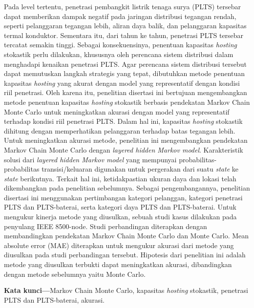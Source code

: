 {
Pada level tertentu, penetrasi pembangkit listrik tenaga surya (PLTS) tersebar dapat memberikan dampak negatif pada jaringan distribusi tegangan rendah, seperti pelanggaran tegangan lebih, aliran daya balik, dan pelanggaran kapasitas termal konduktor. Sementara itu, dari tahun ke tahun, penetrasi PLTS tersebar tercatat semakin tinggi. Sebagai konsekuensinya, penentuan kapasitas \textit{hosting} stokastik perlu dilakukan, khususnya oleh perencana sistem distribusi dalam menghadapi kenaikan penetrasi PLTS. Agar perencana sistem distribusi tersebut dapat memutuskan langkah strategis yang tepat, dibutuhkan metode penentuan kapasitas \textit{hosting} yang akurat dengan model yang representatif dengan kondisi riil penetrasi. Oleh karena itu, penelitian disertasi ini bertujuan mengembangkan metode penentuan kapasitas \textit{hosting} stokastik berbasis pendekatan Markov Chain Monte Carlo untuk meningkatkan akurasi dengan model yang representatif terhadap kondisi riil penetrasi PLTS. Dalam hal ini, kapasitas \textit{hosting} stokastik dihitung dengan memperhatikan pelanggaran terhadap batas tegangan lebih. Untuk meningkatkan akurasi metode, penelitian ini mengembangkan pendekatan Markov Chain Monte Carlo dengan \textit{layered hidden Markov model}. Karakteristik solusi dari \textit{layered hidden Markov model} yang mempunyai probabilitas-probabilitas transisi/keluaran digunakan untuk pergerakan dari suatu \textit{state} ke \textit{state} berikutnya. Terkait hal ini, ketidakpastian ukuran daya dan lokasi telah dikembangkan pada penelitian sebelumnya. Sebagai pengembangannya, penelitian disertasi ini menggunakan pertimbangan kategori pelanggan, kategori penetrasi PLTS dan PLTS-baterai, serta kategori daya PLTS dan PLTS-baterai. Untuk mengukur kinerja metode yang diusulkan, sebuah studi kasus dilakukan pada penyulang IEEE 8500-node. Studi perbandingan diterapkan dengan membandingkan pendekatan Markov Chain Monte Carlo dan Monte Carlo. Mean absolute error (MAE) diterapkan untuk mengukur akurasi dari metode yang diusulkan pada studi perbandingan tersebut. Hipotesis dari penelitian ini adalah metode yang diusulkan terbukti dapat meningkatkan akurasi, dibandingkan dengan metode sebelumnya yaitu Monte Carlo.

\noindent\textbf{Kata kunci---}Markov Chain Monte Carlo, kapasitas \textit{hosting} \vspace*{-5.5pt} stokastik, penetrasi PLTS dan PLTS-baterai, akurasi.
}